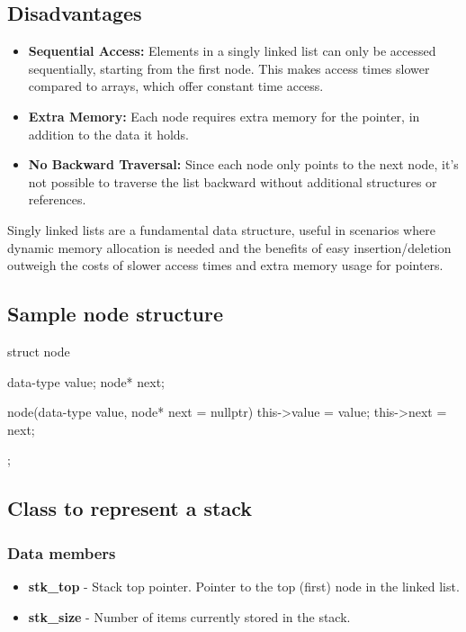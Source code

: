 \documentclass{report}
\begin{document}
\begin{concept}
        \subsection{Disadvantages}
        \begin{itemize}
            \item \textbf{Sequential Access:} Elements in a singly linked list can only be accessed sequentially, starting from the first node. This makes access times slower compared to arrays, which offer constant time access.
            \item \textbf{Extra Memory:} Each node requires extra memory for the pointer, in addition to the data it holds.
            \item \textbf{No Backward Traversal:} Since each node only points to the next node, it's not possible to traverse the list backward without additional structures or references.
        \end{itemize}
        \bigbreak \noindent 
        Singly linked lists are a fundamental data structure, useful in scenarios where dynamic memory allocation is needed and the benefits of easy insertion/deletion outweigh the costs of slower access times and extra memory usage for pointers.
    \end{concept}
    \pagebreak 
    \subsection{Sample node structure}
    \bigbreak \noindent 
    \begin{cppcode}
        struct node
        {
            data-type value;
            node* next;

            node(data-type value, node* next = nullptr)
            {
                this->value = value;
                this->next = next;
            }
        };
    \end{cppcode}

    \bigbreak \noindent 
    \subsection{Class to represent a stack}
    \bigbreak \noindent 
    \subsubsection{Data members}
    \bigbreak \noindent 
    \begin{itemize}
        \item \textbf{stk\_top} - Stack top pointer. Pointer to the top (first) node in the linked list.
        \item \textbf{stk\_size} - Number of items currently stored in the stack.
    \end{itemize}
    \bigbreak \noindent 
\end{document}

